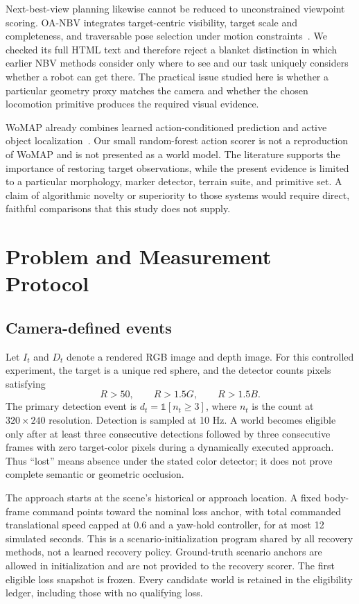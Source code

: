 \documentclass[10pt,twocolumn,a4paper]{article}
\begin{document}
Next-best-view planning likewise cannot be reduced to unconstrained viewpoint scoring. OA-NBV integrates target-centric visibility, target scale and completeness, and traversable pose selection under motion constraints~\cite{oanbv}. We checked its full HTML text and therefore reject a blanket distinction in which earlier NBV methods consider only where to see and our task uniquely considers whether a robot can get there. The practical issue studied here is whether a particular geometry proxy matches the camera and whether the chosen locomotion primitive produces the required visual evidence.

WoMAP already combines learned action-conditioned prediction and active object localization~\cite{womap}. Our small random-forest action scorer is not a reproduction of WoMAP and is not presented as a world model. The literature supports the importance of restoring target observations, while the present evidence is limited to a particular morphology, marker detector, terrain suite, and primitive set. A claim of algorithmic novelty or superiority to those systems would require direct, faithful comparisons that this study does not supply.

\section{Problem and Measurement Protocol}
\subsection{Camera-defined events}
Let $I_t$ and $D_t$ denote a rendered RGB image and depth image. For this controlled experiment, the target is a unique red sphere, and the detector counts pixels satisfying
\begin{equation}
R>50,\qquad R>1.5G,\qquad R>1.5B.
\end{equation}
The primary detection event is $d_t=\mathbb{1}[n_t\geq3]$, where $n_t$ is the count at $320\times240$ resolution. Detection is sampled at 10 Hz. A world becomes eligible only after at least three consecutive detections followed by three consecutive frames with zero target-color pixels during a dynamically executed approach. Thus ``lost'' means absence under the stated color detector; it does not prove complete semantic or geometric occlusion.

The approach starts at the scene's historical or approach location. A fixed body-frame command points toward the nominal loss anchor, with total commanded translational speed capped at $0.6$ and a yaw-hold controller, for at most 12 simulated seconds. This is a scenario-initialization program shared by all recovery methods, not a learned recovery policy. Ground-truth scenario anchors are allowed in initialization and are not provided to the recovery scorer. The first eligible loss snapshot is frozen. Every candidate world is retained in the eligibility ledger, including those with no qualifying loss.
\end{document}
